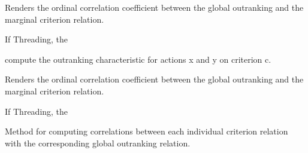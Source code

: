 \documentclass[letterpaper,10pt,english]{sphinxmanual}
\begin{document}
\begin{fulllineitems}
\begin{fulllineitems}
\end{fulllineitems}


\begin{fulllineitems}
\label{techDoc:outrankingDigraphs.OutrankingDigraph.computeCriterionCorrelation}
Renders the ordinal correlation coefficient between
the global outranking and the marginal criterion relation.

If Threading, the

\end{fulllineitems}


\begin{fulllineitems}
\label{techDoc:outrankingDigraphs.OutrankingDigraph.computeCriterionRelation}
compute the outranking characteristic for actions x and y
on criterion c.

\end{fulllineitems}


\begin{fulllineitems}
\label{techDoc:outrankingDigraphs.OutrankingDigraph.computeMarginalCorrelation}
Renders the ordinal correlation coefficient between
the global outranking and the marginal criterion relation.

If Threading, the

\end{fulllineitems}


\begin{fulllineitems}
\label{techDoc:outrankingDigraphs.OutrankingDigraph.computeMarginalVersusGlobalOutrankingCorrelations}
Method for computing correlations between each individual criterion relation with the corresponding
global outranking relation.


\end{fulllineitems}
\end{fulllineitems}
\end{document}
